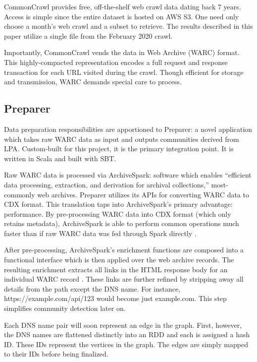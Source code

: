 \documentclass[conference]{IEEEtran}
\begin{document}
CommonCrawl\cite{commonCrawl} provides free, off-the-shelf web crawl data dating back 7 years. Access is simple since the entire dataset is hosted on AWS S3. One need only choose a month's web crawl and a subset to retrieve. The results described in this paper utilize a single file from the February 2020 crawl.

Importantly, CommonCrawl vends the data in Web Archive (WARC) format. This highly-compacted representation encodes a full request and response transaction for each URL visited during the crawl. Though efficient for storage and transmission, WARC demands special care to process.

\subsection{Preparer}

Data preparation responsibilities are apportioned to Preparer: a novel application which takes raw WARC data as input and outputs communities derived from LPA. Custom-built for this project, it is the primary integration point. It is written in Scala and built with SBT.

Raw WARC data is processed via ArchiveSpark: software which enables ``efficient data processing, extraction, and derivation for archival collections,''\cite{archiveSpark} most-commonly web archives. Preparer utilizes its APIs for converting WARC data to CDX format. This translation taps into ArchiveSpark's primary advantage: performance. By pre-processing WARC data into CDX format (which only retains metadata), ArchiveSpark is able to perform common operations much faster than if raw WARC data was fed through Spark directly \cite{generatingCdx}.

After pre-processing, ArchiveSpark's enrichment functions \cite{enrichmentFunctions} are composed into a functional interface which is then applied over the web archive records. The resulting enrichment extracts all links in the HTML response body for an individual WARC record \cite{linkExtraction}. These links are further refined by stripping away all details from the path except the DNS name. For instance, https://example.com/api/123 would become just example.com. This step simplifies community detection later on.

Each DNS name pair will soon represent an edge in the graph. First, however, the DNS names are flattened distinctly into an RDD and each is assigned a hash ID. These IDs represent the vertices in the graph. The edges are simply mapped to their IDs before being finalized.
\end{document}
